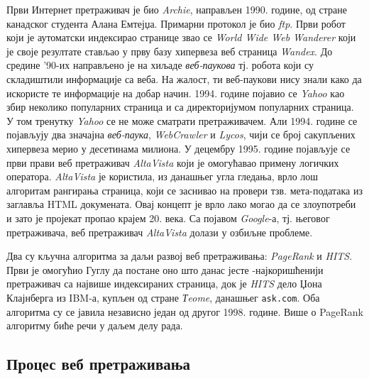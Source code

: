 Први Интернет претраживач је био \emph{Archie},
направљен 1990. године, од стране канадског студента Алана Емтејџа. Примарни
протокол је био \emph{ftp}. Први робот који је аутоматски
индексирао странице звао се \emph{World Wide Web Wanderer} који је своје
резултате стављао у прву базу хипервеза веб страница
\emph{Wandex}. До средине '90-их
направљено је на хиљаде \emph{веб-паукова} тј. робота који су складиштили
информације са веба. На жалост, ти веб-паукови нису знали како да искористе те
информације на добар начин. 1994. године појавио се \emph{Yahoo} као збир неколико популарних
страница и са директоријумом популарних страница. У том тренутку \emph{Yahoo} се
не може сматрати претраживачем. Али 1994. године се појављују два значајна
\emph{веб-паука},
\emph{WebCrawler} и
\emph{Lycos}, чији се број
сакупљених хипервеза мерио у десетинама милиона. У децембру 1995. године
појављује се први прави веб претраживач
\emph{AltaVista} који је омогућавао примену логичких
оператора. \emph{AltaVista} је користила, из данашњег угла гледања, врло лош
алгоритам рангирања страница, који се заснивао на провери тзв. мета-података из
заглавља HTML докумената. Овај концепт је врло лако могао да се злоупотреби и зато је пројекат пропао крајем 20. века. Са појавом \emph{Google}-а, тј. његовог претраживача, веб претраживач \emph{AltaVista} долази у озбиљне проблеме.

Два су кључна алгоритма за даљи развој веб претраживања:
\emph{PageRank} и
\emph{HITS}. Први је омогућио Гуглу да постане оно што
данас јесте -најкоришћенији претраживач са највише индексираних страница, док је
\emph{HITS} дело Џона Клајнберга из IBM-а, купљен од стране \emph{Тeome},
данашњег \texttt{ask.com}. Оба алгоритма су се јавила независно један од другог
1998. године. Више о PageRank алгоритму биће речи у даљем делу рада.

\subsection{Процес веб претраживања}\label{subsec:web}

